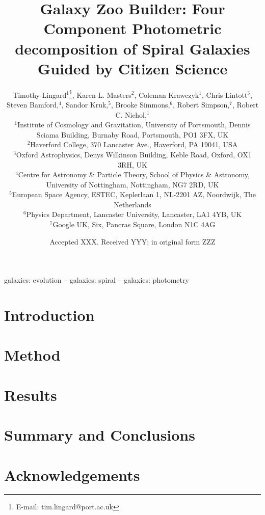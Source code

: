 \documentclass[fleqn,usenatbib]{mnras}
\title[Galaxy Zoo Builder: Method paper]{Galaxy Zoo Builder: Four Component Photometric decomposition of Spiral Galaxies Guided by Citizen Science}
\author[T. Lingard et al.]{
  Timothy Lingard$^{1}$\thanks{E-mail: tim.lingard@port.ac.uk},
  Karen L. Masters$^{2}$,
  Coleman Krawczyk$^{1}$,
  Chris Lintott$^{3}$,
  \newauthor
  Steven Bamford,$^{4}$,
  Sandor Kruk,$^{5}$,
  Brooke Simmons,$^{6}$,
  Robert Simpson,$^{7}$,
  \newauthor
  Robert C. Nichol,$^{1}$
  \\
  $^{1}$Institute of Cosmology and Gravitation, University of Portsmouth, Dennis Sciama Building, Burnaby Road, Portsmouth, PO1 3FX, UK\\
  $^{2}$Haverford College, 370 Lancaster Ave., Haverford, PA 19041, USA\\
  $^{3}$Oxford Astrophysics, Denys Wilkinson Building, Keble Road, Oxford, OX1 3RH, UK\\
  $^{4}$Centre for Astronomy \& Particle Theory, School of Physics \& Astronomy, University of Nottingham, Nottingham, NG7 2RD, UK\\
  $^{5}$European Space Agency, ESTEC, Keplerlaan 1, NL-2201 AZ, Noordwijk, The Netherlands\\
  $^{6}$Physics Department, Lancaster University, Lancaster, LA1 4YB, UK\\
  $^{7}$Google UK, Six, Pancras Square, London N1C 4AG\\
}
\date{Accepted XXX. Received YYY; in original form ZZZ}
\begin{document}
\label{firstpage}
\pagerange{\pageref{firstpage}--\pageref{lastpage}}
\maketitle

\begin{abstract}

\end{abstract}

\begin{keywords}
galaxies: evolution -- galaxies: spiral -- galaxies: photometry
\end{keywords}

\section{Introduction}


\section{Method}


\section{Results}


\section{Summary and Conclusions}


\section{Acknowledgements}





\appendix


\bsp
\label{lastpage}
\end{document}

